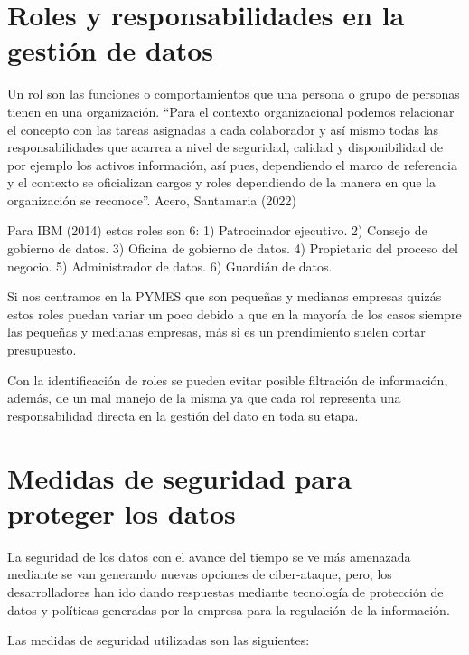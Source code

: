 \documentclass[
  letterpaper,
  DIV=11,
  numbers=noendperiod]{scrreprt}
\begin{document}
\hypertarget{roles-y-responsabilidades-en-la-gestiuxf3n-de-datos}{%
\section{Roles y responsabilidades en la gestión de
datos}\label{roles-y-responsabilidades-en-la-gestiuxf3n-de-datos}}

Un rol son las funciones o comportamientos que una persona o grupo de
personas tienen en una organización. ``Para el contexto organizacional
podemos relacionar el concepto con las tareas asignadas a cada
colaborador y así mismo todas las responsabilidades que acarrea a nivel
de seguridad, calidad y disponibilidad de por ejemplo los activos
información, así pues, dependiendo el marco de referencia y el contexto
se oficializan cargos y roles dependiendo de la manera en que la
organización se reconoce''. Acero, Santamaria (2022)

Para IBM (2014) estos roles son 6: 1) Patrocinador ejecutivo. 2) Consejo
de gobierno de datos. 3) Oficina de gobierno de datos. 4) Propietario
del proceso del negocio. 5) Administrador de datos. 6) Guardián de
datos.

Si nos centramos en la PYMES que son pequeñas y medianas empresas quizás
estos roles puedan variar un poco debido a que en la mayoría de los
casos siempre las pequeñas y medianas empresas, más si es un
prendimiento suelen cortar presupuesto.

Con la identificación de roles se pueden evitar posible filtración de
información, además, de un mal manejo de la misma ya que cada rol
representa una responsabilidad directa en la gestión del dato en toda su
etapa.

\hypertarget{medidas-de-seguridad-para-proteger-los-datos}{%
\section{Medidas de seguridad para proteger los
datos}\label{medidas-de-seguridad-para-proteger-los-datos}}

La seguridad de los datos con el avance del tiempo se ve más amenazada
mediante se van generando nuevas opciones de ciber-ataque, pero, los
desarrolladores han ido dando respuestas mediante tecnología de
protección de datos y políticas generadas por la empresa para la
regulación de la información.

Las medidas de seguridad utilizadas son las siguientes:
\end{document}

